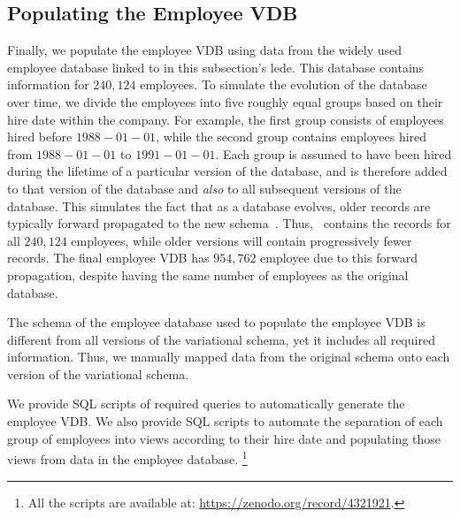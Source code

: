 \subsection{Populating the Employee VDB}
\label{sec:emp-pop}

Finally, we populate the employee VDB using data from the widely used employee
database linked to in this subsection's lede.
%
This database contains information for $240,124$ employees. To simulate the
evolution of the database over time, we divide the employees into five roughly
equal groups based on their hire date within the company. 
For example, the
first group consists of employees hired before $1988-01-01$, while the second
group contains employees hired from $1988-01-01$ to $1991-01-01$.
%
Each group is assumed to have been hired during the lifetime of a particular
version of the database, and is therefore added to that version of the database
and \emph{also} to all subsequent versions of the database. This simulates the
fact that as a database evolves, older records are typically forward propagated
to the new schema~\cite{schVersioningSurvey95Roddick}. Thus, \vFive\ contains
the records for all $240,124$ employees, while older versions will contain
progressively fewer records.
%
The final employee VDB has $954,762$ employee due to this forward propagation,
despite having the same number of employees as the original database.


The schema of the employee database used to populate the employee VDB
 is different from all versions of the
variational schema, yet it includes all required information. Thus,
we manually mapped data from the original schema onto each version of
the variational schema.


We provide SQL scripts of required queries to automatically 
generate the employee VDB.
We also provide SQL scripts to automate the separation of each group of employees
into views according to their hire date%
%
and populating those views from data in the employee database.%
\footnote{All the scripts are available at: \url{https://zenodo.org/record/4321921}.} 


